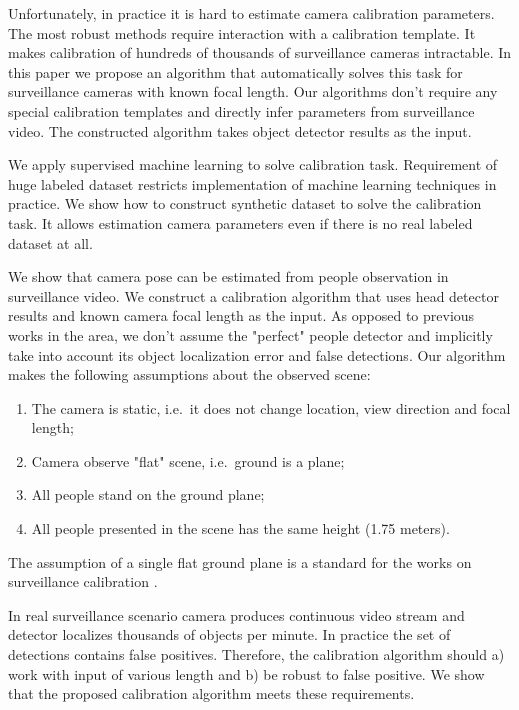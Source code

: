 Unfortunately, in practice it is hard to estimate camera calibration parameters. The most robust methods require interaction with a calibration template. It makes calibration of hundreds of thousands of surveillance cameras intractable. In this paper we propose an algorithm that automatically solves this task for surveillance cameras with known focal length. Our algorithms don't require any special calibration templates and directly infer parameters from surveillance video. The constructed algorithm takes object detector results as the input.

We apply supervised machine learning to solve calibration task. Requirement of huge labeled dataset restricts implementation of machine learning techniques in practice. We show how to construct synthetic dataset to solve the calibration task. It allows estimation camera parameters even if there is no real labeled dataset at all.

We show that camera pose can be estimated from people observation in surveillance video. We construct a calibration algorithm that uses head detector results and known camera focal length as the input. As opposed to previous works in the area, we don't assume the "perfect" people detector and implicitly take into account its object localization error and false detections. Our algorithm makes the following assumptions about the observed scene:
\begin{enumerate}
	\item The camera is static, i.e.\ it does not change location, view direction and focal length;
	\item Camera observe "flat" scene, i.e.\ ground is a plane;
	\item All people stand on the ground plane;
	\item All people presented in the scene has the same height (1.75 meters).
\end{enumerate}
The assumption of a single flat ground plane is a standard for the works on surveillance calibration \cite{liu2011surveillance,chen2007accurate,dubska2014automatic,den2015automatic,micusik2010simultaneous}.

In real surveillance scenario camera produces continuous video stream and detector localizes thousands of objects per minute. In practice the set of detections contains false positives. Therefore, the calibration algorithm should a) work with input of various length and b) be robust to false positive. We show that the proposed calibration algorithm meets these requirements.

